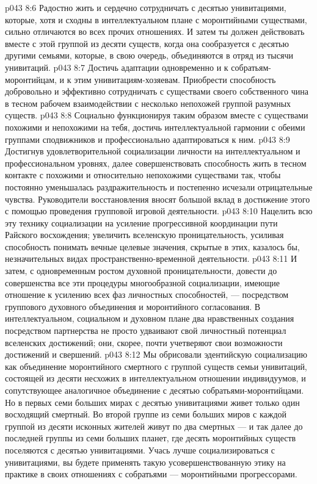 \vs p043 8:6 \pc {}\bibnobreakspace Радостно жить и сердечно сотрудничать с десятью унивитациями, которые, хотя и сходны в интеллектуальном плане с моронтийными существами, сильно отличаются во всех прочих отношениях. И затем ты должен действовать вместе с этой группой из десяти существ, когда она сообразуется с десятью другими семьями, которые, в свою очередь, объединяются в отряд из тысячи унивитаций.
\vs p043 8:7 \pc {}\bibnobreakspace Достичь адаптации одновременно и к собратьям\hyp{}моронтийцам, и к этим унивитациям\hyp{}хозяевам. Приобрести способность добровольно и эффективно сотрудничать с существами своего собственного чина в тесном рабочем взаимодействии с несколько непохожей группой разумных существ.
\vs p043 8:8 \pc {}\bibnobreakspace Социально функционируя таким образом вместе с существами похожими и непохожими на тебя, достичь интеллектуальной гармонии с обеими группами сподвижников и профессионально адаптироваться к ним.
\vs p043 8:9 \pc {}\bibnobreakspace Достигнув удовлетворительной социализации личности на интеллектуальном и профессиональном уровнях, далее совершенствовать способность жить в тесном контакте с похожими и относительно непохожими существами так, чтобы постоянно уменьшалась раздражительность и постепенно исчезали отрицательные чувства. Руководители восстановления вносят большой вклад в достижение этого с помощью проведения групповой игровой деятельности.
\vs p043 8:10 \pc {}\bibnobreakspace Нацелить всю эту технику социализации на усиление прогрессивной координации пути Райского восхождения; увеличить вселенскую проницательность, усиливая способность понимать вечные целевые значения, скрытые в этих, казалось бы, незначительных видах пространственно\hyp{}временной деятельности.
\vs p043 8:11 \pc {}\bibnobreakspace И затем, с одновременным ростом духовной проницательности, довести до совершенства все эти процедуры многообразной социализации, имеющие отношение к усилению всех фаз личностных способностей, --- посредством группового духовного объединения и моронтийного согласования. В интеллектуальном, социальном и духовном плане два нравственных создания посредством партнерства не просто удваивают свой личностный потенциал вселенских достижений; они, скорее, почти учетверяют свои возможности достижений и свершений.
\vs p043 8:12 \pc Мы обрисовали эдентийскую социализацию как объединение моронтийного смертного с группой существ семьи унивитаций, состоящей из десяти несхожих в интеллектуальном отношении индивидуумов, и сопутствующее аналогичное объединение с десятью собратьями\hyp{}моронтийцами. Но в первых семи больших мирах с десятью унивитациями живет только один восходящий смертный. Во второй группе из семи больших миров с каждой группой из десяти исконных жителей живут по два смертных --- и так далее до последней группы из семи больших планет, где десять моронтийных существ поселяются с десятью унивитациями. Учась лучше социализироваться с унивитациями, вы будете применять такую усовершенствованную этику на практике в своих отношениях с собратьями --- моронтийными прогрессорами.
